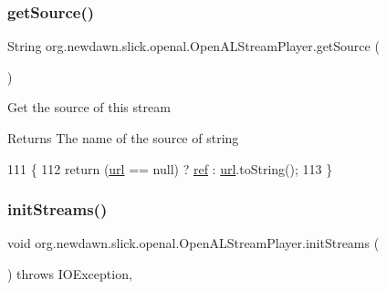 \subsubsection{\texorpdfstring{get\+Source()}{getSource()}}
{\footnotesize\ttfamily String org.\+newdawn.\+slick.\+openal.\+Open\+A\+L\+Stream\+Player.\+get\+Source (\begin{DoxyParamCaption}{ }\end{DoxyParamCaption})\hspace{0.3cm}{\ttfamily [inline]}}

Get the source of this stream

\begin{DoxyReturn}{Returns}
The name of the source of string 
\end{DoxyReturn}

\begin{DoxyCode}
111                               \{
112         \textcolor{keywordflow}{return} (\mbox{\hyperlink{classorg_1_1newdawn_1_1slick_1_1openal_1_1_open_a_l_stream_player_a2f903c9bc54f0a1d739ad917a8aa97f6}{url}} == null) ? \mbox{\hyperlink{classorg_1_1newdawn_1_1slick_1_1openal_1_1_open_a_l_stream_player_ab01c1f73849aaeae84d969cbd05d4683}{ref}} : \mbox{\hyperlink{classorg_1_1newdawn_1_1slick_1_1openal_1_1_open_a_l_stream_player_a2f903c9bc54f0a1d739ad917a8aa97f6}{url}}.toString();
113     \}
\end{DoxyCode}
\mbox{\label{classorg_1_1newdawn_1_1slick_1_1openal_1_1_open_a_l_stream_player_a765f3c95de540350a0ed4902a6d9792a}} 
\subsubsection{\texorpdfstring{init\+Streams()}{initStreams()}}
{\footnotesize\ttfamily void org.\+newdawn.\+slick.\+openal.\+Open\+A\+L\+Stream\+Player.\+init\+Streams (\begin{DoxyParamCaption}{ }\end{DoxyParamCaption}) throws I\+O\+Exception\hspace{0.3cm}{\ttfamily [inline]}, {\ttfamily [private]}}

